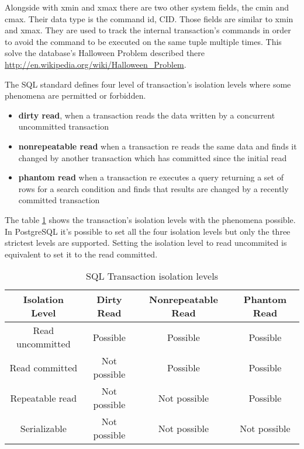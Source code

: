 Alongside with xmin and xmax there are two other system fields, the cmin and cmax. Their data
type is the command id, CID. Those fields are similar to xmin and xmax. They are used to track the
internal transaction's commands in order to avoid the command to be executed on the same
tuple multiple times. This solve the database's Halloween Problem described there
\href{http://en.wikipedia.org/wiki/Halloween_Problem}{
http://en.wikipedia.org/wiki/Halloween\_Problem}.\newline

The SQL standard defines four level of transaction's isolation levels where 
some phenomena are permitted or forbidden.

\begin{itemize}
 \item \textbf{dirty read}, when a transaction reads the data written by a concurrent 
uncommitted transaction

\item \textbf{nonrepeatable read} when a transaction re reads the same data and finds it changed by
another transaction which has committed since the initial read

\item \textbf{phantom read} when a transaction re executes a query returning a set 
of rows for a search condition and finds that results are changed by a recently committed 
transaction

\end{itemize}

The table \ref{tab:TRNISOLATION} shows the transaction's isolation levels with the phenomena
possible. In PostgreSQL it's possible to set all the four isolation levels but only the three
strictest levels are supported. Setting the  isolation level to read uncommited is
equivalent to set it to the read committed.

\begin{table}[H]
  \begin{tabular}{cccc}
    Isolation Level & Dirty Read    &    Nonrepeatable Read   &   Phantom 
Read\\ 
    \hline
    Read uncommitted  &  Possible    &    Possible     &   Possible\\
    Read committed    &  Not possible &  Possible     &   Possible\\
    Repeatable read   &  Not possible  & Not possible  &  Possible\\
    Serializable      &  Not possible  & Not possible   & Not possible\\
  \end{tabular}
  \caption{\label{tab:TRNISOLATION}SQL Transaction isolation levels}
\end{table}

